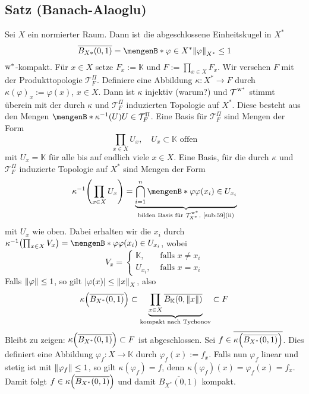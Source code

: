 \subsection{Satz (Banach-Alaoglu)} %
\label{sub:510}
Sei $X$ ein normierter Raum. Dann ist die abgeschlossene Einheitskugel in $X^*$
\[
	\overline{B_{X*}(0,1)} = \set[\varphi \in X^*]{\norm[X^*]{\varphi} \le 1}  
\]
$\mathrm{w}^*$-kompakt.
Für $x \in X$ setze $F_x := \mathds{K}$ und $F := \prod_{x \in X} F_x$. Wir versehen $F$ mit der Produkttopologie $\mathcal{T}_F^\Pi$. Definiere eine Abbildung
$\kappa : X^* \to F$ durch $\kappa(\varphi)_x := \varphi(x)$, $x \in X$. Dann ist $\kappa$ injektiv (warum?) und $\weakTstar{ }$ stimmt überein mit der durch $\kappa$ und
$\mathcal{T}_F^\Pi$ induzierten Topologie auf $X^*$. Diese besteht aus den Mengen $\set[\kappa ^{-1}(U)]{U \in \mathcal{T}_F^\Pi}$. Eine Basis für $\mathcal{T}_F^\Pi$ sind
Mengen der Form 
\[
	\prod_{x \in X} U_x, \quad U_x \subset \mathds{K} \text{ offen} 
\]
mit $U_x = \mathds{K}$ für alle bis auf endlich viele $x \in X$. Eine Basis, für die durch
$\kappa$ und $\mathcal{T}_F^\Pi$ induzierte Topologie auf $X^*$ sind Mengen der Form
\[
	\kappa ^{-1} \enbrace*{ \prod_{x \in X} U_x} = \underbrace{\bigcap_{i=1}^n \set[\varphi]{\varphi(x_i) \in U_{x_i}} }_{
	\text{bilden Basis für $\weakTstar{X^*}$, \ref{sub:59}(ii)}}
\]
mit $U_x$ wie oben. Dabei erhalten wir die $x_i$ durch $\kappa ^{-1} \enbrace*{\prod_{x \in X} V_x} = \set[\varphi]{\varphi(x_i)\in U_{x_i}}$, wobei 
\[
	V_x = \begin{cases}
		\mathds{K}, &\text{ falls } x \not= x_i\\
		U_{x_i}, &\text{ falls } x=x_i
	\end{cases}
\]
Falls $\norm{\varphi} \le 1$, so gilt $\abs*{\varphi(x)} \le \norm[X]{x}$, also 
\[
	\kappa \enbrace*{\overline{B_{X^*}(0,1)}} \subset \underbrace{\prod_{x \in X} \overline{B_{\mathds{K}}(0, \norm{x})}}_{\text{kompakt nach Tychonov}} \subset F
\]
Bleibt zu zeigen: $\kappa \enbrace*{\overline{B_{X^*}(0,1)}} \subset F$ ist abgeschlossen. Sei $f \in \overline{\kappa \enbrace*{\overline{B_{X^*}(0,1)}}}$. Dies definiert
eine Abbildung $\varphi_f : X \to \mathds{K}$ durch $\varphi_f(x) := f_x$. Falls nun $\varphi_f$ linear und stetig ist mit $\norm{\varphi_f} \le 1$, so gilt
$\kappa(\varphi_f) = f$, denn $\kappa(\varphi_f)(x) = \varphi_f(x) = f_x$. Damit folgt $f \in \kappa \enbrace*{ \overline{B_{X^*}(0,1)}}$ und damit 
$\overline{B_{X^*}(0,1)}$ kompakt.
